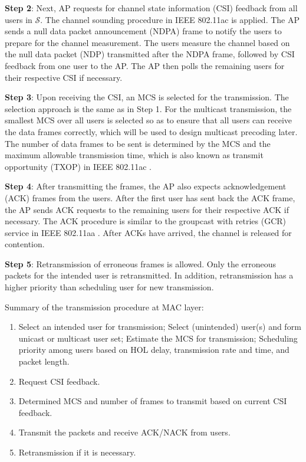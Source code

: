 \documentclass[conference]{IEEEtran}
\newcommand{\0}{\vect{0}}
\newcommand{\1}{\vect{1}}
\begin{document}
{\bf Step 2}: Next, AP requests for channel state information (CSI) feedback from all users in $\mathcal{S}$. The channel sounding procedure in IEEE 802.11ac \cite{IEEE13AC} is applied. The AP sends a null data packet  announcement (NDPA) frame to notify the users to prepare for the channel measurement. The users measure the channel based on the null data packet (NDP) transmitted after the NDPA frame, followed by CSI feedback from one user to the AP. The AP then polls the remaining users for their respective CSI  if necessary.

{\bf Step 3}: Upon receiving the CSI, an MCS is selected for the transmission. The selection approach is the same as in Step 1. For the multicast transmission, the smallest MCS over all users is selected so as to ensure that all users can receive the data frames correctly, which will be used to design multicast precoding later. The number of data frames to be sent is determined by the MCS and the maximum allowable transmission time, which is also known as transmit opportunity (TXOP) in IEEE 802.11ac \cite{IEEE13AC}.

{\bf Step 4}:
After transmitting the frames, the AP also expects acknowledgement (ACK) frames from the users. After the first user has sent back the ACK frame, the AP sends ACK requests to the remaining users for their respective ACK if necessary. The ACK procedure is similar to the groupcast with retries (GCR) service in IEEE 802.11aa \cite{IEEE12AA}. After ACKs have arrived, the channel is released for contention.

{\bf Step 5}: Retransmission of erroneous frames is allowed. Only the erroneous packets for the intended user is retransmitted. In addition, retransmission has a higher priority than scheduling user for new transmission.

Summary of the transmission procedure at MAC layer:


\begin{framed}
\begin{enumerate}[Step~1:]
\item Select an intended user for transmission; Select (unintended) user(s) and form unicast or multicast user set; Estimate the MCS for transmission; Scheduling priority among users based on HOL delay, transmission rate and time, and packet length.
\item Request CSI feedback.
\item Determined MCS and number of frames to transmit based on current CSI feedback.
\item Transmit the packets and receive ACK/NACK from users.
\item Retransmission if it is necessary.
\end{enumerate}
\end{framed}
\end{document}
